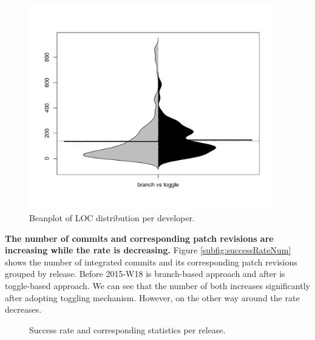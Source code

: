 \begin{figure}
\includegraphics[width=0.95\textwidth]{figure/avgLOC.pdf}
\caption{Beanplot of LOC distribution per developer.}
\label{fig:LOC}
\end{figure}


\textbf{The number of commits and corresponding patch revisions are increasing while the rate is decreasing.} Figure \ref{subfig:successRateNum} shows the number of integrated commits and its corresponding patch revisions grouped by release. Before 2015-W18 is branch-based approach and after is toggle-based approach. We can see that the number of both increases significantly after adopting toggling mechanism. However, on the other way around the rate decreases. 

\begin{figure}
\caption{Success rate and corresponding statistics per release.}
\label{fig:successRate}
\end{figure}


